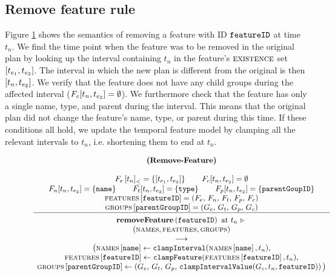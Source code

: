 \subsection{Remove feature rule}
Figure \ref{rule:remove-feature} shows the semantics of removing a feature with ID $\texttt{featureID}$ at time $t_n$. We find the time point when the feature was to be removed in the original plan by looking up the interval containing $t_n$ in the feature's $\textsc{existence}$ set $\interval{t_{e_1}}{t_{e_2}}$. The interval in which the new plan is different from the original is then $\interval{t_n}{t_{e_2}}$. We verify that the feature does not have any child groups during the affected interval ($F_c \interval{t_{n}}{t_{e_2}} = \emptyset$). We furthermore check that the feature has only a single name, type, and parent during the interval. This means that the original plan did not change the feature's name, type, or parent during this time. If these conditions all hold, we update the temporal feature model by clamping all the relevant intervals to $t_n$, i.e. shortening them to end at $t_n$. 

\begin{figure}
    \renewcommand{\arraystretch}{1.1}
    \sossize$$\begin{array}{c}
      \ntyperule{Remove-Feature}
      {\\
        \containing{F_e}{t_n} = \set{\interval{t_{e_1}}{t_{e_2}}} \qquad
        F_c \interval{t_{n}}{t_{e_2}} = \emptyset \\
        F_n \interval{t_n}{t_{e_2}} = \set{\var{name}} \qquad
        F_t \interval{t_n}{t_{e_2}} = \set{\var{type}} \qquad
        F_p \interval{t_n}{t_{e_2}} = \set{\var{parentGoupID}} \\
        \lookup{\features{}}{\var{featureID}} = \left( F_e,\, F_n,\, F_t,\, F_p,\, F_c \right) \\
        \lookup{\groups{}}{\var{parentGroupID}} = \left( G_e,\, G_t,\, G_p,\, G_c \right)
      }
      {
        \textbf{removeFeature}\left( \var{featureID}\right) \text{ at } t_n \shove \\
        (\names{}, \features{}, \groups{}) \\
        \transition \\
        \big(\lookup{\names{}}{\var{name}} \assign \var{clampInterval}(\lookup{\names{}}{\var{name}}, t_n),\\
        \lookup{\features{}}{\var{featureID}} \assign \var{clampFeature}(\lookup{\features{}}{\var{featureID}}, t_n) ,\\
        \lookup{\groups{}}{\var{parentGroupID}} \assign \left( G_e,\, G_t,\, G_p,\, \var{clampIntervalValue}(G_c, t_n, \var{featureID})\right)\big)
      }
    \end{array}$$
  \caption{\label{rule:remove-feature}}
\end{figure}

